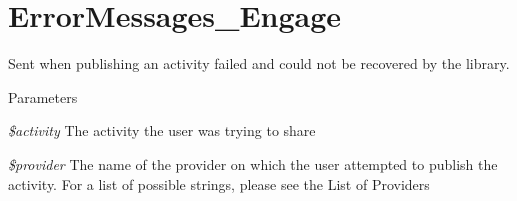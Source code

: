 \hypertarget{group___error_messages___engage}{
\section{ErrorMessages\_\-Engage}
\label{group___error_messages___engage}
}
Sent when publishing an activity failed and could not be recovered by the library.


\begin{DoxyParams}{Parameters}
\item[{\em \$activity}]The activity the user was trying to share\item[{\em \$provider}]The name of the provider on which the user attempted to publish the activity. For a list of possible strings, please see the List of Providers \end{DoxyParams}
